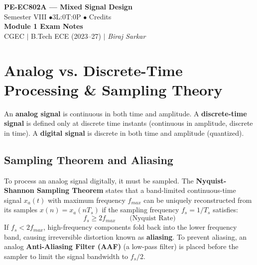 \documentclass[12pt,a4paper]{article}
\begin{document}

\begin{center}
  {\LARGE\bfseries\color{myred} PE-EC802A --- Mixed Signal Design}\\[5pt]
  {\normalsize\color{mydark} Semester VIII \quad$\bullet$\quad 3L:0T:0P \quad$\bullet$ Credits}\\[3pt]
  {\normalsize\color{myteal}\textbf{Module 1 Exam Notes}}\\[3pt]
  {\small\color{mydark} CGEC \;$|$\; B.Tech ECE (2023--27) \;$|$\; \textit{Biraj Sarkar}}
\end{center}
\vspace{2pt}
\noindent{\color{myred}\rule{\linewidth}{1.5pt}}
\vspace{2pt}

\hypersetup{linkcolor=mydark}
\tableofcontents
\hypersetup{linkcolor=myteal}
\newpage

\section{Analog vs. Discrete-Time Processing \& Sampling Theory}

\begin{tcolorbox}[defbox, title={\textbf{Analog vs. Discrete-Time Signals}}]
An \textbf{analog signal} is continuous in both time and amplitude. A \textbf{discrete-time signal} is defined only at discrete time instants (continuous in amplitude, discrete in time). A \textbf{digital signal} is discrete in both time and amplitude (quantized).
\end{tcolorbox}

\subsection{Sampling Theorem and Aliasing}
To process an analog signal digitally, it must be sampled. The \textbf{Nyquist-Shannon Sampling Theorem} states that a band-limited continuous-time signal $x_a(t)$ with maximum frequency $f_{max}$ can be uniquely reconstructed from its samples $x(n) = x_a(nT_s)$ if the sampling frequency $f_s = 1/T_s$ satisfies:
\[
f_s \ge 2 f_{max} \qquad \text{(Nyquist Rate)}
\]
If $f_s < 2 f_{max}$, high-frequency components fold back into the lower frequency band, causing irreversible distortion known as \textbf{aliasing}. To prevent aliasing, an analog \textbf{Anti-Aliasing Filter (AAF)} (a low-pass filter) is placed before the sampler to limit the signal bandwidth to $f_s/2$.
\end{document}
